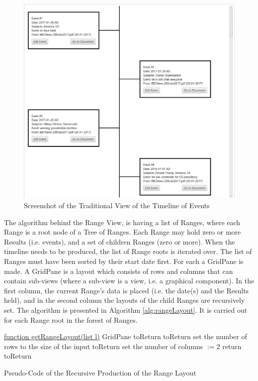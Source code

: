 \begin{figure}[H]
\caption{Screenshot of the Traditional View of the Timeline of Events}
\label{fig:traditionalView}
\includegraphics[scale=0.5]{traditionalView.png}
\centering
\end{figure}

\par The algorithm behind the Range View, is having a list of Ranges, where each Range is a root node of a Tree of Ranges. Each Range may hold zero or more Results (i.e. events), and a set of children Ranges (zero or more). When the timeline needs to be produced, the list of Range roots is iterated over. The list of Ranges must have been sorted by their start date first. For each a GridPane is made. A GridPane is a layout which consists of rows and columns that can contain sub-views (where a sub-view is a view, i.e. a graphical component). In the first column, the current Range's data is placed (i.e. the date(s) and the Results held), and in the second column the layouts of the child Ranges are recursively set. The algorithm is presented in Algorithm \ref{alg:rangeLayout}. It is carried out for each Range root in the forest of Ranges. \par

\begin{algorithm}[H]
\underline{function getRangeLayout(list l)}\;
GridPane toReturn\;
toReturn set the number of rows to the size of the input\;
toReturn set the number of columns $:= 2$\;
return toReturn\;
\caption{Pseudo-Code of the Recursive Production of the Range Layout}
\label{alg:rangeLayout}
\end{algorithm}

